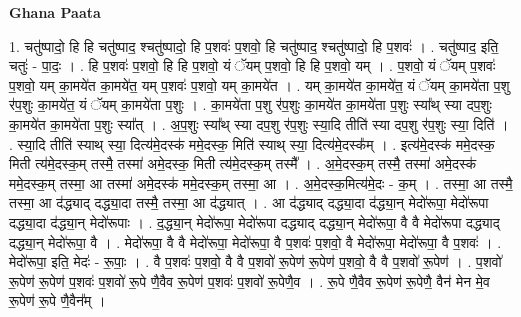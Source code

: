 \documentclass[17pt]{extarticle}
\begin{document}
\textbf{Ghana Paata } \newline

1. चतु॑ष्पादो॒ हि हि चतु॑ष्पाद॒ श्चतु॑ष्पादो॒ हि प॒शवः॑ प॒शवो॒ हि चतु॑ष्पाद॒ श्चतु॑ष्पादो॒ हि प॒शवः॑ । . चतु॑ष्पाद॒ इति॒ चतुः॑ - पा॒दः॒ । . हि प॒शवः॑ प॒शवो॒ हि हि प॒शवो॒ यं ॅयम् प॒शवो॒ हि हि प॒शवो॒ यम् । . प॒शवो॒ यं ॅयम् प॒शवः॑ प॒शवो॒ यम् का॒मये॑त का॒मये॑त॒ यम् प॒शवः॑ प॒शवो॒ यम् का॒मये॑त । . यम् का॒मये॑त का॒मये॑त॒ यं ॅयम् का॒मये॑ता प॒शु र॑प॒शुः का॒मये॑त॒ यं ॅयम् का॒मये॑ता प॒शुः । . का॒मये॑ता प॒शु र॑प॒शुः का॒मये॑त का॒मये॑ता प॒शुः स्या᳚थ् स्या दप॒शुः का॒मये॑त का॒मये॑ता प॒शुः स्या᳚त् । . अ॒प॒शुः स्या᳚थ् स्या दप॒शु र॑प॒शुः स्या॒दि तीति॑ स्या दप॒शु र॑प॒शुः स्या॒ दिति॑ । . स्या॒दि तीति॑ स्याथ् स्या॒ दित्य॑मे॒दस्क॑ ममे॒दस्क॒ मिति॑ स्याथ् स्या॒ दित्य॑मे॒दस्क᳚म् । . इत्य॑मे॒दस्क॑ ममे॒दस्क॒ मिती त्य॑मे॒दस्क॒म् तस्मै॒ तस्मा॑ अमे॒दस्क॒ मिती त्य॑मे॒दस्क॒म् तस्मै᳚ । . अ॒मे॒दस्क॒म् तस्मै॒ तस्मा॑ अमे॒दस्क॑ ममे॒दस्क॒म् तस्मा॒ आ तस्मा॑ अमे॒दस्क॑ ममे॒दस्क॒म् तस्मा॒ आ । . अ॒मे॒दस्क॒मित्य॑मे॒दः - क॒म् । . तस्मा॒ आ तस्मै॒ तस्मा॒ आ द॑द्ध्याद् दद्ध्या॒दा तस्मै॒ तस्मा॒ आ द॑द्ध्यात् । . आ द॑द्ध्याद् दद्ध्या॒दा द॑द्ध्या॒न् मेदो॑रूपा॒ मेदो॑रूपा दद्ध्या॒दा द॑द्ध्या॒न् मेदो॑रूपाः । . द॒द्ध्या॒न् मेदो॑रूपा॒ मेदो॑रूपा दद्ध्याद् दद्ध्या॒न् मेदो॑रूपा॒ वै वै मेदो॑रूपा दद्ध्याद् दद्ध्या॒न् मेदो॑रूपा॒ वै । . मेदो॑रूपा॒ वै वै मेदो॑रूपा॒ मेदो॑रूपा॒ वै प॒शवः॑ प॒शवो॒ वै मेदो॑रूपा॒ मेदो॑रूपा॒ वै प॒शवः॑ । . मेदो॑रूपा॒ इति॒ मेदः॑ - रू॒पाः॒ । . वै प॒शवः॑ प॒शवो॒ वै वै प॒शवो॑ रू॒पेण॑ रू॒पेण॑ प॒शवो॒ वै वै प॒शवो॑ रू॒पेण॑ । . प॒शवो॑ रू॒पेण॑ रू॒पेण॑ प॒शवः॑ प॒शवो॑ रू॒पे णै॒वैव रू॒पेण॑ प॒शवः॑ प॒शवो॑ रू॒पेणै॒व । . रू॒पे णै॒वैव रू॒पेण॑ रू॒पेणै॒ वैन॑ मेन मे॒व रू॒पेण॑ रू॒पे णै॒वैन᳚म् । \newline
\end{document}
